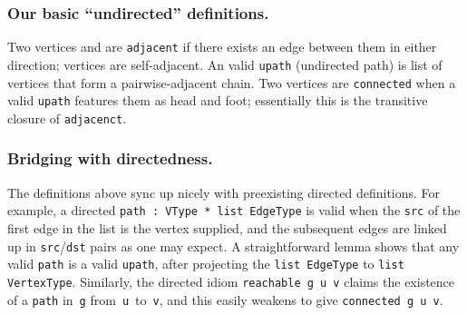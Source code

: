 


\subsubsection{Our basic ``undirected'' definitions.}
Two vertices  and  are \texttt{adjacent} if there exists
an edge between them in either direction; vertices are self-adjacent.
An valid \texttt{upath} (undirected path) is list of 
vertices that form a  
pairwise-adjacent chain. Two vertices are \texttt{connected} when a valid \texttt{upath}
features them as head and foot; essentially this is the transitive 
closure of \texttt{adjacenct}.

\subsubsection{Bridging with directedness.}
The definitions above sync up nicely with preexisting directed
definitions. 
For example, a directed \texttt{path~: VType~* list~EdgeType}
is valid when the \texttt{src} of the first edge in the list 
is the vertex supplied, and the subsequent edges are linked up 
in \texttt{src}/\texttt{dst} pairs
as one may expect. A straightforward lemma shows that 
any valid \texttt{path} is a valid \texttt{upath}, after projecting the
\texttt{list EdgeType} to \texttt{list VertexType}.
Similarly, the directed idiom \texttt{reachable~g~u~v} claims the 
existence of a \texttt{path} in~\texttt{g} from~\texttt{u}~to~\texttt{v}, 
and this easily weakens to give \texttt{connected~g~u~v}.

